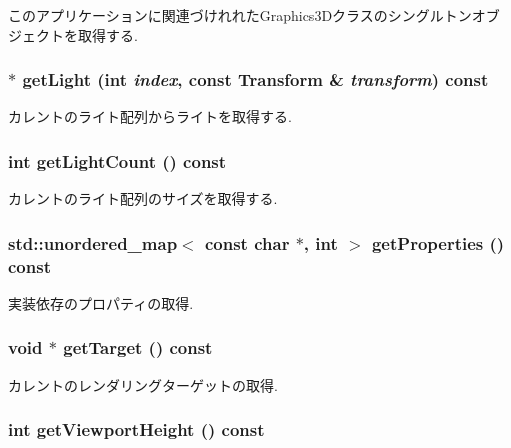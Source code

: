 このアプリケーションに関連づけれれたGraphics3Dクラスのシングルトンオブジェクトを取得する. \hypertarget{classm3g_1_1Graphics3D_04272e584440c89fb4cb449003a84e7d}{
\subsubsection[{getLight}]{ $\ast$ getLight (int {\em index}, \/  const {\bf Transform} \& {\em transform}) const}}
\label{classm3g_1_1Graphics3D_04272e584440c89fb4cb449003a84e7d}


カレントのライト配列からライトを取得する. \hypertarget{classm3g_1_1Graphics3D_7a08cfeb48d76ad5d8859a1fc0c77d98}{
\subsubsection[{getLightCount}]{\setlength{\rightskip}{0pt plus 5cm}int getLightCount () const}}
\label{classm3g_1_1Graphics3D_7a08cfeb48d76ad5d8859a1fc0c77d98}


カレントのライト配列のサイズを取得する. \hypertarget{classm3g_1_1Graphics3D_a7d4779a1ea7779caf7f409c4d2bb31f}{
\subsubsection[{getProperties}]{\setlength{\rightskip}{0pt plus 5cm}std::unordered\_\-map$<$ const char $\ast$, int $>$ getProperties () const}}
\label{classm3g_1_1Graphics3D_a7d4779a1ea7779caf7f409c4d2bb31f}


実装依存のプロパティの取得. \hypertarget{classm3g_1_1Graphics3D_02d0033930c8e68f4d7ebd43abe7980a}{
\subsubsection[{getTarget}]{\setlength{\rightskip}{0pt plus 5cm}void $\ast$ getTarget () const}}
\label{classm3g_1_1Graphics3D_02d0033930c8e68f4d7ebd43abe7980a}


カレントのレンダリングターゲットの取得. \hypertarget{classm3g_1_1Graphics3D_d51e0c421126f5deb61b359cdb7dab2e}{
\subsubsection[{getViewportHeight}]{\setlength{\rightskip}{0pt plus 5cm}int getViewportHeight () const}}
\label{classm3g_1_1Graphics3D_d51e0c421126f5deb61b359cdb7dab2e}


